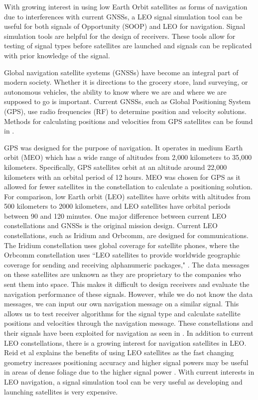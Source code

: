 \documentclass[12pt]{report}
\begin{document}
With growing interest in using low Earth Orbit satellites as forms of navigation due to interferences with current GNSSs, a LEO signal simulation tool can be useful for both signals of Opportunity (SOOP) and LEO for navigation. Signal simulation tools are helpful for the design of receivers. These tools allow for testing of signal types before satellites are launched and signals can be replicated with prior knowledge of the signal.  

Global navigation satellite systems (GNSSs) have become an integral part of modern society. Whether it is directions to the grocery store, land surveying, or autonomous vehicles, the ability to know where we are and where we are supposed to go is important. Current GNSSs, such as Global Positioning System (GPS), use radio frequencies (RF) to determine position and velocity solutions. Methods for calculating positions and velocities from GPS satellites can be found in \cite{misraGlobalPositioningSystem2012}.

GPS was designed for the purpose of navigation. It operates in medium Earth orbit (MEO) which has a wide range of altitudes from 2,000 kilometers to 35,000 kilometers. Specifically, GPS satellites orbit at an altitude around 22,000 kilometers with an orbital period of 12 hours. MEO was chosen for GPS as it allowed for fewer satellites in the constellation to calculate a positioning solution. For comparison, low Earth orbit (LEO) satellites have orbits with altitudes from 500 kilometers to 2000 kilometers, and LEO satellites have orbital periods between 90 and 120 minutes. One major difference between current LEO constellations and GNSSs is the original mission design. Current LEO constellations, such as Iridium and Orbcomm, are designed for communications. The Iridium constellation uses global coverage for satellite phones, where the Orbcomm constellation uses ``LEO satellites to provide worldwide geographic coverage for sending and receiving alphanumeric packages," \cite{orabiOpportunisticNavigationDoppler2021}. The data messages on these satellites are unknown as they are proprietary to the companies who sent them into space. This makes it difficult to design receivers and evaluate the navigation performance of these signals. However, while we do not know the data messages, we can input our own navigation message on a similar signal. This allows us to test receiver algorithms for the signal type and calculate satellite positions and velocities through the navigation message. These constellations and their signals have been exploited for navigation as seen in \cite{orabiOpportunisticNavigationDoppler2021}. In addition to current LEO constellations, there is a growing interest for navigation satellites in LEO. Reid et al explains the benefits of using LEO satellites as the fast changing geometry increases positioning accuracy and higher signal powers may be useful in areas of dense foliage due to the higher signal power \cite{reidSatelliteNavigationAge2020}. With current interests in LEO navigation, a signal simulation tool can be very useful as developing and launching satellites is very expensive.
\end{document}
